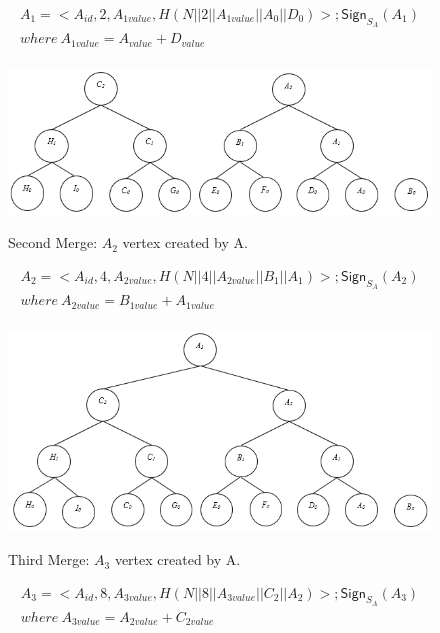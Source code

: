 \begin{exmp}
				\begin{equation}
					\begin{array}{l}
				A_{1} = <A_{id}, 2, A_{1value}, H(N||2||A_{1value}||A_{0}||D_{0})>; \textsf{Sign}_{S_{A}}(A_{1})\\
				where\  A_{1value} = A_{value} + D_{value} \\
					\end{array}	
				\end{equation}
				\begin{figure}[h!]
					\centering
					\includegraphics[scale = 1]{images/commitment-tree-example-3.png}\\
					\caption{Second Merge: $A_{2}$ vertex created by A.}
					\label{fig:commitment-tree-example-3}
				\end{figure}
				\begin{equation}
					\begin{array}{l}
						A_{2} = <A_{id}, 4, A_{2value}, H(N||4||A_{2value}||B_{1}||A_{1}) >; \textsf{Sign}_{S_{A}}(A_{2})\\
						where\  A_{2value} = B_{1value} + A_{1value} \\
					\end{array}
				\end{equation}
				\begin{figure}[h!]
					\centering
					\includegraphics[scale = 1]{images/commitment-tree-example-4.png}\\
					\caption{Third Merge: $A_{3}$ vertex created by A.}
					\label{fig:commitment-tree-example-4}
				\end{figure}
				\begin{equation}
					\begin{array}{l}
						A_{3} = <A_{id},8, A_{3value},H(N||8||A_{3value}||C_{2}||A_{2})>; \textsf{Sign}_{S_{A}}(A_{3})\\
						where\ A_{3value} = A_{2value} + C_{2value}
					\end{array}
				\end{equation}
			\end{exmp}

